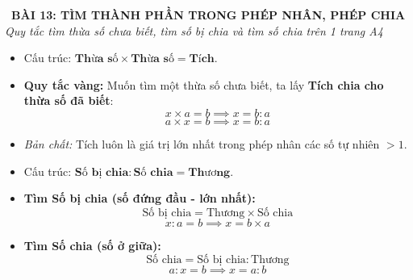 \documentclass[12pt,a4paper]{article}
\begin{document}
\begin{tcolorbox}[
  enhanced,
  colback=teal!8!white,
  colframe=teal!70!black,
  arc=3mm, boxrule=1.2pt,
  left=3mm, right=3mm, top=2mm, bottom=2mm,
  halign=center
]
  {\LARGE\bfseries\color{teal!90!black}\faBookmark\ BÀI 13: TÌM THÀNH PHẦN TRONG PHÉP NHÂN, PHÉP CHIA}\\[1mm]
  {\itshape\footnotesize\color{black!75} Quy tắc tìm thừa số chưa biết, tìm số bị chia và tìm số chia trên 1 trang A4}
\end{tcolorbox}

\vspace{-2mm}

\noindent
\begin{minipage}[t]{0.49\textwidth}\vspace{0pt}
\begin{tcolorbox}[
  enhanced,
  colback=blue!4!white,
  colframe=blue!75!black,
  arc=2mm, boxrule=0.8pt,
  left=2mm, right=2mm, top=1.8mm, bottom=1.8mm,
  title={\footnotesize\bfseries\color{white}\faKey\ 1. Tìm Thừa số chưa biết}
]
{\footnotesize
\begin{itemize}\setlength{\itemsep}{1pt}\setlength{\leftskip}{-2.5mm}
  \item Cấu trúc: $\mathbf{\text{Thừa số}} \times \mathbf{\text{Thừa số}} = \mathbf{\text{Tích}}$.
  \item \textbf{Quy tắc vàng:} Muốn tìm một thừa số chưa biết, ta lấy \textbf{Tích chia cho thừa số đã biết}:
  $$x \times a = b \implies x = b : a$$
  $$a \times x = b \implies x = b : a$$
  \item \textit{Bản chất:} Tích luôn là giá trị lớn nhất trong phép nhân các số tự nhiên $>1$.
\end{itemize}
}
\end{tcolorbox}
\end{minipage}
\hfill
\begin{minipage}[t]{0.49\textwidth}\vspace{0pt}
\begin{tcolorbox}[
  enhanced,
  colback=teal!4!white,
  colframe=teal!75!black,
  arc=2mm, boxrule=0.8pt,
  left=2mm, right=2mm, top=1.8mm, bottom=1.8mm,
  title={\footnotesize\bfseries\color{white}\faSliders\ 2. Tìm Số bị chia \& Số chia}
]
{\footnotesize
\begin{itemize}\setlength{\itemsep}{1pt}\setlength{\leftskip}{-2.5mm}
  \item Cấu trúc: $\mathbf{\text{Số bị chia}} : \mathbf{\text{Số chia}} = \mathbf{\text{Thương}}$.
  \item \textbf{Tìm Số bị chia (số đứng đầu - lớn nhất):}
  $$\text{Số bị chia} = \text{Thương} \times \text{Số chia}$$
  $$x : a = b \implies x = b \times a$$
  \item \textbf{Tìm Số chia (số ở giữa):}
  $$\text{Số chia} = \text{Số bị chia} : \text{Thương}$$
  $$a : x = b \implies x = a : b$$
\end{itemize}
}
\end{tcolorbox}
\end{minipage}
\end{document}
